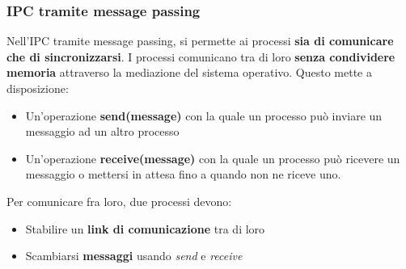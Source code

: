 \documentclass[12pt]{article}
\begin{document}
\subsubsection{IPC tramite message passing}
Nell'IPC tramite message passing, si permette ai processi \textbf{sia di comunicare che di sincronizzarsi}.
I processi comunicano tra di loro \textbf{senza condividere memoria} attraverso la mediazione del sistema operativo.
Questo mette a disposizione:
\begin{itemize}
    \item Un'operazione \textbf{send(message)} con la quale un processo può inviare un messaggio ad un altro processo
    \item Un'operazione \textbf{receive(message)} con la quale un processo può ricevere un messaggio o mettersi in attesa fino a quando non ne riceve uno.
\end{itemize}
Per comunicare fra loro, due processi devono:
\begin{itemize}
    \item Stabilire un \textbf{link di comunicazione} tra di loro
    \item Scambiarsi \textbf{messaggi} usando \textit{send} e \textit{receive}
\end{itemize}
\end{document}
